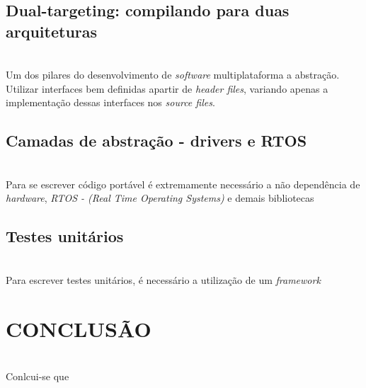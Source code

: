 \documentclass[times, twoside, watermark]{artigo}
\begin{document}
\subsection{Dual-targeting: compilando para duas arquiteturas}\hfill\\
Um dos pilares do desenvolvimento de \textit{software} multiplataforma a abstração.
Utilizar interfaces bem definidas apartir de \textit{header files}, variando apenas
a implementação dessas interfaces nos \textit{source files}.



\subsection{Camadas de abstração - drivers e RTOS}\hfill\\
Para se escrever código portável é extremamente necessário a não dependência de 
\textit{hardware}, \textit{RTOS - (Real Time Operating Systems)} e demais bibliotecas


\subsection{Testes unitários}\hfill\\
Para escrever testes unitários, é necessário a utilização de um \textit{framework}



\section*{CONCLUSÃO}\hfill\\
Conlcui-se que 


\section*{}


\cite{martin2009clean}
\cite{martin2018clean}
\cite{denardin2019sistemas}
\end{document}
